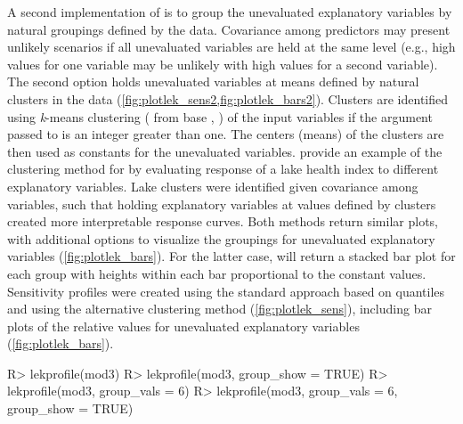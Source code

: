 \documentclass[article,shortnames]{jss}
\begin{document}
A second implementation of  is to group the unevaluated explanatory variables by natural groupings defined by the data. Covariance among predictors may present unlikely scenarios if all unevaluated variables are held at the same level (e.g., high values for one variable may be unlikely with high values for a second variable). The second option holds unevaluated variables at means defined by natural clusters in the data (\cref{fig:plotlek_sens2,fig:plotlek_bars2}). Clusters are identified using {\it k}-means clustering ( from base , \citealt{Hartigan79}) of the input variables if the argument passed to  is an integer greater than one. The centers (means) of the clusters are then used as constants for the unevaluated variables.  \citet{Beck14a} provide an example of the clustering method for  by evaluating response of a lake health index to different explanatory variables.  Lake clusters were identified given covariance among variables, such that holding explanatory variables at values defined by clusters created more interpretable response curves.  Both methods return similar plots, with additional options to visualize the groupings for unevaluated explanatory variables (\cref{fig:plotlek_bars}).  For the latter case,  will return a stacked bar plot for each group with heights within each bar proportional to the constant values.  Sensitivity profiles were created using the standard approach based on quantiles and using the alternative clustering method (\cref{fig:plotlek_sens}), including bar plots of the relative values for unevaluated explanatory variables (\cref{fig:plotlek_bars}).
\begin{Schunk}
\begin{Sinput}
R> lekprofile(mod3)
R> lekprofile(mod3, group_show = TRUE)
R> lekprofile(mod3, group_vals = 6)
R> lekprofile(mod3, group_vals = 6, group_show = TRUE)
\end{Sinput}
\end{Schunk}
\end{document}
